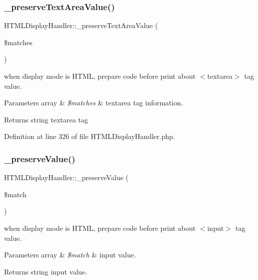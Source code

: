 \subsubsection{\texorpdfstring{\+\_\+preserve\+Text\+Area\+Value()}{\_preserveTextAreaValue()}}
{\footnotesize\ttfamily H\+T\+M\+L\+Display\+Handler\+::\+\_\+preserve\+Text\+Area\+Value (\begin{DoxyParamCaption}\item[{}]{\$matches }\end{DoxyParamCaption})}

when display mode is H\+T\+ML, prepare code before print about $<$textarea$>$ tag value. 
\begin{DoxyParams}[1]{Parameters}
array & {\em \$matches} & textarea tag information. \\
\hline
\end{DoxyParams}
\begin{DoxyReturn}{Returns}
string textarea tag 
\end{DoxyReturn}


Definition at line 326 of file H\+T\+M\+L\+Display\+Handler.\+php.

\hypertarget{classHTMLDisplayHandler_aa99a0e119ab322b0e323d1109f668a35}{}\label{classHTMLDisplayHandler_aa99a0e119ab322b0e323d1109f668a35} 
\subsubsection{\texorpdfstring{\+\_\+preserve\+Value()}{\_preserveValue()}}
{\footnotesize\ttfamily H\+T\+M\+L\+Display\+Handler\+::\+\_\+preserve\+Value (\begin{DoxyParamCaption}\item[{}]{\$match }\end{DoxyParamCaption})}

when display mode is H\+T\+ML, prepare code before print about $<$input$>$ tag value. 
\begin{DoxyParams}[1]{Parameters}
array & {\em \$match} & input value. \\
\hline
\end{DoxyParams}
\begin{DoxyReturn}{Returns}
string input value. 
\end{DoxyReturn}


